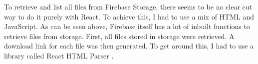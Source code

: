 To retrieve and list all files from Firebase Storage, there seems to be no clear cut way to do it purely with React. To achieve this, I had to use a mix of HTML and JavaScript. As can be seen above, Firebase itself has a lot of inbuilt functions to retrieve files from storage. First, all files stored in storage were retrieved. A download link for each file was then generated. To get around this, I had to use a library called React HTML Parser \cite{react_html_parser}. 